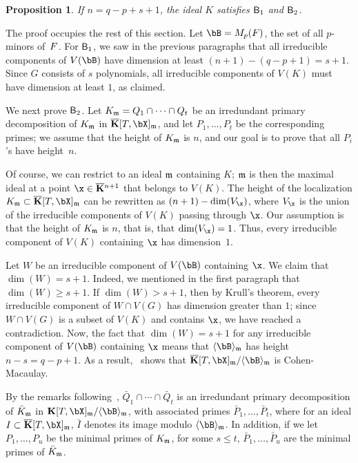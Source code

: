 \documentclass[12pt]{article}
\newtheorem{proposition}[definition]{Proposition}
\begin{document}
\begin{proposition}\label{prop:KH1H2}
  If $n=q-p+s+1$, the ideal $K$ satisfies $\mathsf{B}_1$ and $\mathsf{B}_2$.
\end{proposition}

The proof occupies the rest of this section. Let $\bB=M_p(\mF)$, the
set of all $p$-minors of~${F}$. For $\mathsf{B}_1$, we saw in the previous
paragraphs that all irreducible components of $V(\bB)$ have dimension
at least $(n+1)-(q-p+1)=s+1$. Since $G$ consists of $s$ polynomials,
all irreducible components of $V(K)$ must have dimension at least $1$,
as claimed.

We next prove $\mathsf{B}_2$. Let $K_{\mathfrak{m}}=Q_1 \cap \cdots \cap Q_t$ be an
irredundant primary decomposition of $K_{\mathfrak{m}}$ in $\KKbar[T,\bX]_\m$, and
let $P_1,\dots,P_t$ be the corresponding primes; we assume that the
height of $K_{\mathfrak{m}}$ is $n$, and our goal is to prove that all $P_i$'s
have height~$n$.

Of course, we can restrict to an ideal $\mathfrak{m}$ containing $K$; $\mathfrak{m}$ is
then the maximal ideal at a point $\x \in \KKbar{}^{n+1}$ that belongs
to $V(K)$. The height of the localization $K_\m \subset
\KKbar[T,\bX]_\m$ can be rewritten as $(n+1)-\dim(V_\x)$, where $V_\x$
is the union of the irreducible components of $V(K)$ passing through
$\x$. Our assumption is that the height of $K_{\mathfrak{m}}$ is $n$, that is,
that $\dim(V_\x)=1$. Thus, every irreducible component of $V(K)$
containing $\x$ has dimension~$1$.

Let $W$ be an irreducible component of $V(\bB)$ containing $\x$.  We
claim that $\dim(W)=s+1$. Indeed, we mentioned in the first paragraph
that $\dim(W) \ge s+1$. If $\dim(W) > s+1$, then by Krull's theorem,
every irreducible component of $W \cap V(G)$ has dimension greater
than $1$; since $W \cap V(G)$ is a subset of $V(K)$ and contains $\x$,
we have reached a contradiction. Now, the fact that $\dim(W)=s+1$ for
any irreducible component of $V(\bB)$ containing $\x$ means that
$\langle \bB \rangle_\m$ has height $n-s=q-p+1$.  As a
result,~\cite[Theorem~18.18]{Eisenbud95} shows that
$\KKbar[T,\bX]_\m/\langle \bB \rangle_\m$ is Cohen-Macaulay.

By the remarks following~\cite[Theorem~IV.5.9]{ZaSa58}, $\bar Q_1 \cap
\cdots \cap \bar Q_t$ is an irredundant primary decomposition of $\bar
K_{\mathfrak{m}}$ in $\KK[T,\bX]_\m/\langle \bB \rangle_\m$, with associated
primes $\bar P_1,\dots,\bar P_t$, where for an ideal $I \subset
\KKbar[T,\bX]_\m$, $\bar I$ denotes its image modulo $\langle \bB
\rangle_\m$. In addition, if we let $P_1,\dots,P_u$ be the minimal
primes of $K_{\mathfrak{m}}$, for some $s \le t$, $\bar P_1,\dots,\bar P_u$ are
the minimal primes of $\bar K_{\mathfrak{m}}$.
\end{document}
